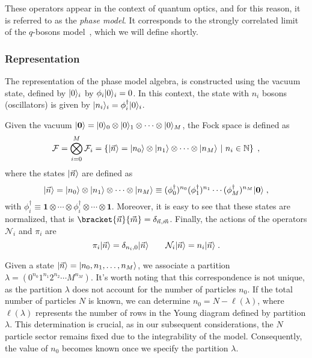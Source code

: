 \documentclass[a4paper,11pt]{amsart}
\begin{document}
These operators appear in the context of quantum optics, and for this
reason, it is referred to as the \emph{phase model}. It corresponds to
the strongly correlated limit of the \(q\)-bosons
model~\cite{Bogoliubov:1997soj}, which we will define shortly.


\subsubsection{Representation}
The representation of the phase model algebra, is constructed using
the vacuum state, defined by \(\lvert0\rangle_i\) by \(\phi_i\lvert0\rangle_i =
0\). In this context, the state with \(n_i\) bosons (oscillators) is
given by \(\lvert n_i\rangle_i = \phi_i^\dagger \lvert0\rangle_i\).

Given the vacuum \(\lvert\bm{0}\rangle = \lvert0\rangle_0\otimes \lvert0\rangle_1
\otimes \cdots \otimes  \lvert0\rangle_M\), the Fock space is defined as 
\begin{equation}
  \mathcal{F} = \bigotimes_{i=0}^M \mathcal{F}_i = 
  \left\{\lvert\vec{n}\rangle = \lvert n_0\rangle\otimes \lvert n_1\rangle \otimes \cdots
  \otimes \lvert n_M\rangle \ | \ n_i \in \mathbb{N} \right\}\; ,
\end{equation}
where the states \(\lvert\vec{n}\rangle\) are defined as 
\begin{equation}
  \lvert\vec{n}\rangle = \lvert n_0\rangle\otimes \lvert n_1\rangle \otimes \cdots \otimes \lvert n_M\rangle 
 \equiv  (\phi_0^\dagger)^{n_0} (\phi_1^\dagger)^{n_1} \cdots  (\phi_M^\dagger)^{n_M} \lvert\bm{0}\rangle \; ,
\end{equation}
with \(\phi_i^\dagger \equiv \bm{1} \otimes \cdots \otimes
\phi_i^\dagger \otimes \cdots \otimes \bm{1}\).  Moreover, it is easy
to see that these states are normalized, that is
\(\bracket{\vec{n}}{\vec{m}}=\delta_{\vec{n}, \vec{m}}\).  Finally,
the actions of the operators \(\mathcal{N}_i\) and \(\pi_i\) are
\begin{equation}
    \pi_i\lvert\vec{n}\rangle  = \delta_{n_i, 0} \lvert\vec{n}\rangle \qquad 
    \mathcal{N}_i\lvert\vec{n}\rangle = n_i \lvert\vec{n}\rangle\; .
\end{equation}
 
Given a state \(\lvert\vec{n}\rangle = \lvert n_0, n_1, \dots, n_M\rangle\), we
associate a partition \( \lambda = (0^{n_0} 1^{n_1} 2^{n_2} \cdots
M^{n_M})\).  It's worth noting that this correspondence is not unique,
as the partition \(\lambda\) does not account for the number of
particles \(n_0\).  If the total number of particles \(N\) is known,
we can determine \(n_0 = N - \ell(\lambda)\), where \(\ell(\lambda)\)
represents the number of rows in the Young diagram defined by
partition \(\lambda\). This determination is crucial, as in our
subsequent considerations, the \(N\) particle sector remains fixed due
to the integrability of the model. Consequently, the value of \(n_0\)
becomes known once we specify the partition \(\lambda\).
\end{document}
